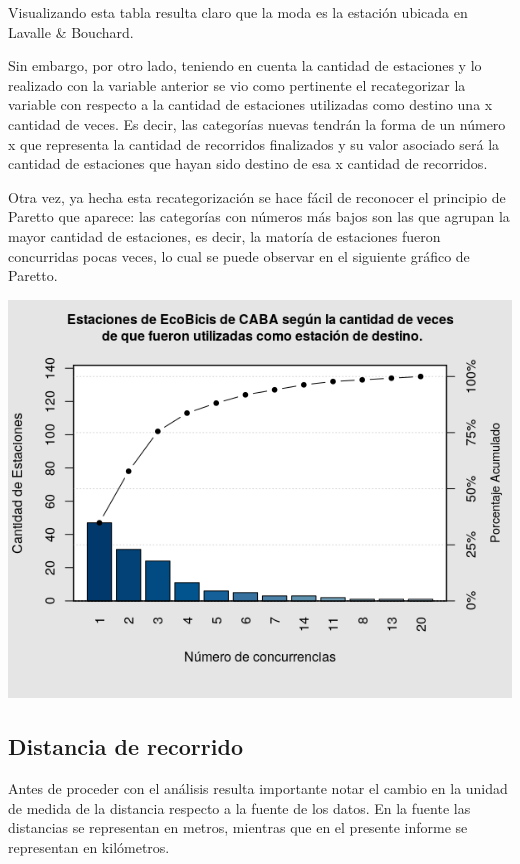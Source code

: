 \documentclass[11pt]{article}
\begin{document}
    Visualizando esta tabla resulta claro que la moda es la estaci\'on ubicada en Lavalle \& Bouchard. 

    Sin embargo, por otro lado, teniendo en cuenta la cantidad de estaciones y lo realizado con la variable anterior se vio como pertinente el recategorizar la variable 
    con respecto a la cantidad de estaciones utilizadas como destino una x cantidad de veces. Es decir, 
    las categor\'ias nuevas tendr\'an la forma de un n\'umero x que representa la cantidad de recorridos finalizados y su valor
    asociado ser\'a la cantidad de estaciones que hayan sido destino de esa x cantidad de recorridos. 

    Otra vez, ya hecha esta recategorizaci\'on se hace f\'acil de reconocer el principio de Paretto que aparece: las categor\'ias con n\'umeros m\'as bajos son las que 
    agrupan la mayor cantidad de estaciones, es decir, la mator\'ia de estaciones fueron concurridas pocas veces, lo cual se puede observar en el siguiente gr\'afico de Paretto. 

    \begin{center}
      \includegraphics[scale=0.7]{ParettoDest.png}
    \end{center}

    \subsection{Distancia de recorrido}

    Antes de proceder con el an\'alisis resulta importante notar el cambio en la unidad 
    de medida de la distancia respecto a la fuente de los datos. En la fuente las distancias 
    se representan en metros, mientras que en el presente informe se representan en kil\'ometros. 
\end{document}
